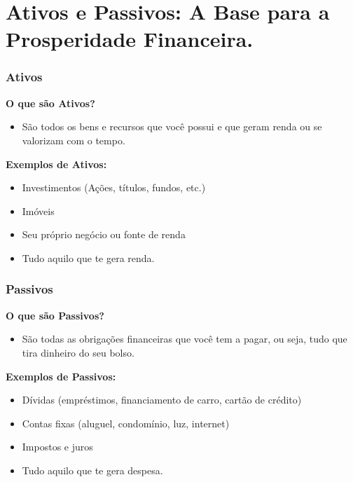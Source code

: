 \section{Ativos e Passivos: A Base para a Prosperidade Financeira.}

\begin{frame}[c]\frametitle{Ativos}
  \textbf{O que são Ativos?}
  \begin{itemize}
    \item São todos os bens e recursos que você possui e que geram renda ou se valorizam com o tempo.
  \end{itemize}

  \textbf{Exemplos de Ativos:}
  \begin{itemize}
    \item Investimentos (Ações, títulos, fundos, etc.)
    \item Imóveis
    \item Seu próprio negócio ou fonte de renda
    \item Tudo aquilo que te gera renda.
  \end{itemize}
\end{frame}

\begin{frame}[c]\frametitle{Passivos}
  \textbf{O que são Passivos?}
  \begin{itemize}
    \item São todas as obrigações financeiras que você tem a pagar, ou seja, tudo que tira dinheiro do seu bolso.
  \end{itemize}

  \textbf{Exemplos de Passivos:}
  \begin{itemize}
    \item Dívidas (empréstimos, financiamento de carro, cartão de crédito)
    \item Contas fixas (aluguel, condomínio, luz, internet)
    \item Impostos e juros
    \item Tudo aquilo que te gera despesa.
  \end{itemize}
\end{frame}


